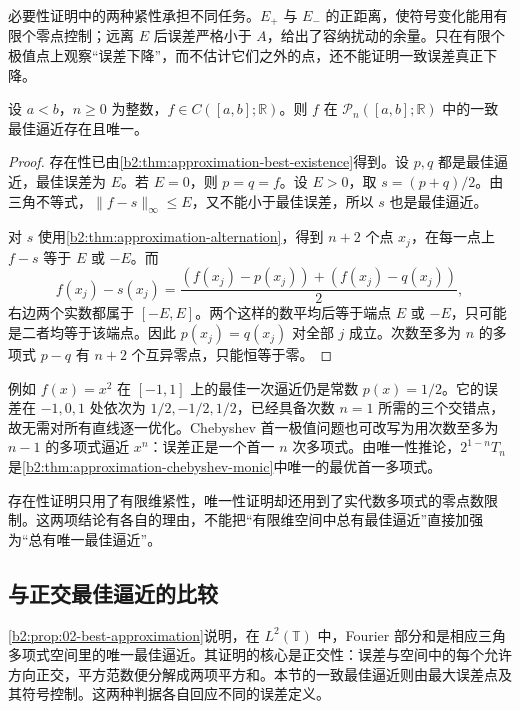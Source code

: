 必要性证明中的两种紧性承担不同任务。\(E_+\) 与 \(E_-\) 的正距离，使符号变化能用有限个零点控制；远离 \(E\) 后误差严格小于 \(A\)，给出了容纳扰动的余量。只在有限个极值点上观察“误差下降”，而不估计它们之外的点，还不能证明一致误差真正下降。

\begin{corollary}
\label{b2:cor:approximation-best-unique}
设 \(a<b\)，\(n\geq0\) 为整数，\(f\in C([a,b];\mathbb R)\)。则 \(f\) 在 \(\mathcal P_n([a,b];\mathbb R)\) 中的一致最佳逼近存在且唯一。
\end{corollary}
\begin{proof}
存在性已由\cref{b2:thm:approximation-best-existence}得到。设 \(p,q\) 都是最佳逼近，最佳误差为 \(E\)。若 \(E=0\)，则 \(p=q=f\)。设 \(E>0\)，取 \(s=(p+q)/2\)。由三角不等式，\(\lVert f-s\rVert_\infty\leq E\)，又不能小于最佳误差，所以 \(s\) 也是最佳逼近。

对 \(s\) 使用\cref{b2:thm:approximation-alternation}，得到 \(n+2\) 个点 \(x_j\)，在每一点上 \(f-s\) 等于 \(E\) 或 \(-E\)。而
\[
 f(x_j)-s(x_j)
 =\frac{(f(x_j)-p(x_j))+(f(x_j)-q(x_j))}{2},
\]
右边两个实数都属于 \([-E,E]\)。两个这样的数平均后等于端点 \(E\) 或 \(-E\)，只可能是二者均等于该端点。因此 \(p(x_j)=q(x_j)\) 对全部 \(j\) 成立。次数至多为 \(n\) 的多项式 \(p-q\) 有 \(n+2\) 个互异零点，只能恒等于零。
\end{proof}

例如 \(f(x)=x^2\) 在 \([-1,1]\) 上的最佳一次逼近仍是常数 \(p(x)=1/2\)。它的误差在 \(-1,0,1\) 处依次为 \(1/2,-1/2,1/2\)，已经具备次数 \(n=1\) 所需的三个交错点，故无需对所有直线逐一优化。Chebyshev 首一极值问题也可改写为用次数至多为 \(n-1\) 的多项式逼近 \(x^n\)：误差正是一个首一 \(n\) 次多项式。由唯一性推论，\(2^{1-n}T_n\) 是\cref{b2:thm:approximation-chebyshev-monic}中唯一的最优首一多项式。

\ProseParagraphBreak
存在性证明只用了有限维紧性，唯一性证明却还用到了实代数多项式的零点数限制。这两项结论有各自的理由，不能把“有限维空间中总有最佳逼近”直接加强为“总有唯一最佳逼近”。

\subsection{与正交最佳逼近的比较}
\label{b2:subsec:020804}

\cref{b2:prop:02-best-approximation}说明，在 \(L^2(\mathbb T)\) 中，Fourier 部分和是相应三角多项式空间里的唯一最佳逼近。其证明的核心是正交性：误差与空间中的每个允许方向正交，平方范数便分解成两项平方和。本节的一致最佳逼近则由最大误差点及其符号控制。这两种判据各自回应不同的误差定义。

